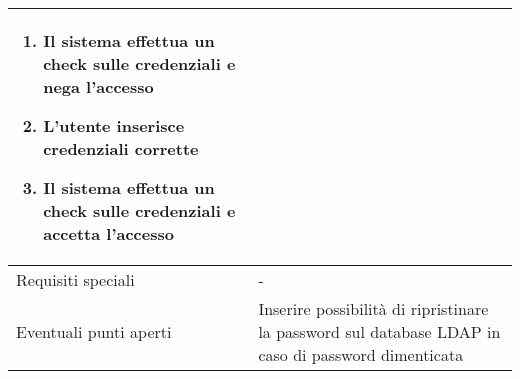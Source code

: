 \documentclass[../../main.tex]{subfiles}
\begin{document}
\begin{tabularx}{150mm}{|l|X|}
\begin {enumerate}
\item{Il sistema effettua un check sulle credenziali e nega l'accesso}
\item{L'utente inserisce credenziali corrette}
\item{Il sistema effettua un check sulle credenziali e accetta l'accesso}
    \end{enumerate}
    \\
    \hline
    Requisiti speciali                  & -   \\
    \hline
    Eventuali punti aperti              &    Inserire possibilità di ripristinare la password sul database LDAP in caso di password dimenticata \\
    \hline
\end{tabularx}
\vfill\newpage
\end{document}
